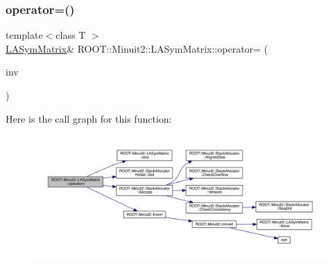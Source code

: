 \subsubsection{\texorpdfstring{operator=()}{operator=()}\hspace{0.1cm}{\footnotesize\ttfamily [12/14]}}
{\footnotesize\ttfamily template$<$class T $>$ \\
\mbox{\hyperlink{classROOT_1_1Minuit2_1_1LASymMatrix}{L\+A\+Sym\+Matrix}}\& R\+O\+O\+T\+::\+Minuit2\+::\+L\+A\+Sym\+Matrix\+::operator= (\begin{DoxyParamCaption}\item[{const \mbox{\hyperlink{classROOT_1_1Minuit2_1_1ABObj}{A\+B\+Obj}}$<$ \mbox{\hyperlink{classROOT_1_1Minuit2_1_1sym}{sym}}, \mbox{\hyperlink{classROOT_1_1Minuit2_1_1MatrixInverse}{Matrix\+Inverse}}$<$ \mbox{\hyperlink{classROOT_1_1Minuit2_1_1sym}{sym}}, \mbox{\hyperlink{classROOT_1_1Minuit2_1_1ABObj}{A\+B\+Obj}}$<$ \mbox{\hyperlink{classROOT_1_1Minuit2_1_1sym}{sym}}, \mbox{\hyperlink{classROOT_1_1Minuit2_1_1LASymMatrix}{L\+A\+Sym\+Matrix}}, T $>$, T $>$, T $>$ \&}]{inv }\end{DoxyParamCaption})\hspace{0.3cm}{\ttfamily [inline]}}

Here is the call graph for this function\+:
\nopagebreak
\begin{figure}[H]
\begin{center}
\leavevmode
\includegraphics[width=350pt]{d3/d72/classROOT_1_1Minuit2_1_1LASymMatrix_a95fd77b55f726095a231817852fceb7d_cgraph}
\end{center}
\end{figure}
\mbox{\label{classROOT_1_1Minuit2_1_1LASymMatrix_a166f84f8396e20c14225ae139ba6af25}} 
